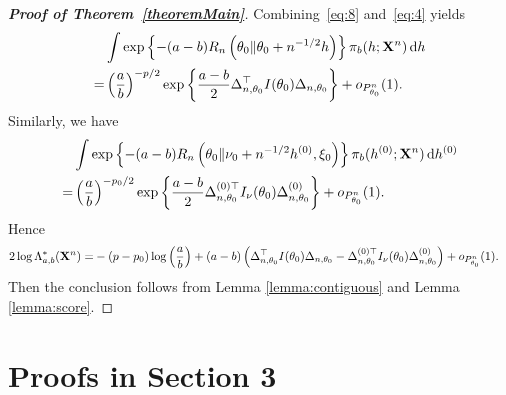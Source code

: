 \documentclass[11pt]{article}
\theoremstyle{plain}
\theoremstyle{definition}
\theoremstyle{remark}
\begin{document}
\begin{appendices}
\begin{proof}[\textbf{Proof of Theorem~\ref{theoremMain}}]
Combining~\eqref{eq:8} and~\eqref{eq:4} yields
\begin{equation*}
    \begin{split}
    &\int 
\exp\left\{ - (a-b) R_n \left( \theta_0 \| \theta_0 + n^{-1/2} h \right) \right\}
    \pi_b (h;\mathbf{X}^{n})  \, \mathrm dh
    \\
    =&\left(\frac{a}{b}\right)^{-p/2} \exp\left\{\frac{a-b}{2}\Delta_{n,\theta_0}^\top  I(\theta_0)\Delta_{n,\theta_0}\right\}+o_{P_{\theta_0}^n}(1).
    \end{split}
\end{equation*}
Similarly, we have
\begin{equation*}
    \begin{split}
    &\int 
\exp\left\{ - (a-b) R_n \left( \theta_0 \| \nu_0 + n^{-1/2} h^{(0)}, \xi_0 \right) \right\}
    \pi_b (h^{(0)};\mathbf{X}^{n})  \, \mathrm dh^{(0)}
    \\
    =&\left(\frac{a}{b}\right)^{-p_0/2} \exp\left\{\frac{a-b}{2}\Delta_{n,\theta_0}^{(0)\top} I_\nu(\theta_0)\Delta^{(0)}_{n,\theta_0}\right\}+o_{P_{\theta_0}^n}(1).
    \end{split}
\end{equation*}
Hence
\begin{equation*}
    \begin{aligned} 
        2\log \Lambda_{a,b}^* (\mathbf{X}^n)
        =&
        -{(p-p_0)}\log \left(\frac{a}{b}\right)+{(a-b)}\left(
            \Delta_{n,\theta_0}^\top  I(\theta_0) \Delta_{n,\theta_0}
        -\Delta_{n,\theta_0}^{(0)\top} I_\nu(\theta_0)\Delta^{(0)}_{n,\theta_0}\right)
        +o_{P^n_{\theta_0}}(1).
    \end{aligned}
\end{equation*}
Then the conclusion follows from Lemma \ref{lemma:contiguous} and Lemma \ref{lemma:score}.
\end{proof}

\section{Proofs in Section 3}


\end{appendices}
\end{document}
